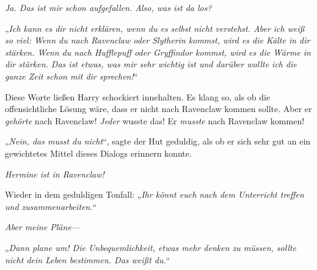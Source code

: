 \emph{Ja. Das ist mir schon aufgefallen. Also, was ist da los? }

„\emph{Ich kann es dir nicht erklären, wenn du es selbst nicht verstehst. Aber ich weiß so viel: Wenn du nach Ravenclaw oder Slytherin kommst, wird es die Kälte in dir stärken. Wenn du nach Hufflepuff oder Gryffindor kommst, wird es die Wärme in dir stärken. Das ist etwas, was mir sehr wichtig ist und darüber wollte ich die ganze Zeit schon mit dir sprechen!}“

Diese Worte ließen Harry schockiert innehalten. Es klang so, als ob die offensichtliche Lösung wäre, dass er nicht nach Ravenclaw kommen sollte. Aber er \emph{gehörte} nach Ravenclaw! \emph{Jeder} wusste das! Er \emph{musste} nach Ravenclaw kommen!

„\emph{Nein, das musst du nicht}“, sagte der Hut geduldig, als ob er sich sehr gut an ein gewichtetes Mittel dieses Dialogs erinnern konnte.

\emph{Hermine ist in Ravenclaw!}

Wieder in dem geduldigen Tonfall: „\emph{Ihr könnt euch nach dem Unterricht treffen und zusammenarbeiten.}“

\emph{Aber meine Pläne—}

„\emph{Dann plane um! Die Unbequemlichkeit, etwas mehr denken zu müssen, sollte nicht dein Leben bestimmen. Das \emph{weißt} du.}“

